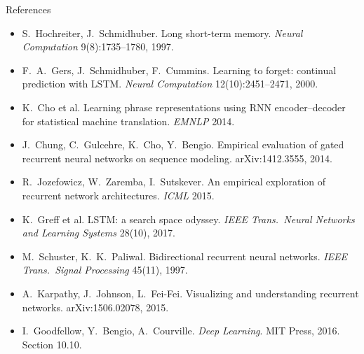 \documentclass[aspectratio=169,10pt]{beamer}
\begin{document}
\begin{frame}[plain]
\begin{columns}[T]
  \end{columns}
\end{frame}

\begin{frame}{References}
  \footnotesize
  \begin{itemize}[<1->]
    \item S.\ Hochreiter, J.\ Schmidhuber. Long short-term memory. \emph{Neural Computation} 9(8):1735--1780, 1997.
    \item F.\ A.\ Gers, J.\ Schmidhuber, F.\ Cummins. Learning to forget: continual prediction with LSTM. \emph{Neural Computation} 12(10):2451--2471, 2000.
    \item K.\ Cho et al. Learning phrase representations using RNN encoder--decoder for statistical machine translation. \emph{EMNLP} 2014.
    \item J.\ Chung, C.\ Gulcehre, K.\ Cho, Y.\ Bengio. Empirical evaluation of gated recurrent neural networks on sequence modeling. arXiv:1412.3555, 2014.
    \item R.\ Jozefowicz, W.\ Zaremba, I.\ Sutskever. An empirical exploration of recurrent network architectures. \emph{ICML} 2015.
    \item K.\ Greff et al. LSTM: a search space odyssey. \emph{IEEE Trans.\ Neural Networks and Learning Systems} 28(10), 2017.
    \item M.\ Schuster, K.\ K.\ Paliwal. Bidirectional recurrent neural networks. \emph{IEEE Trans.\ Signal Processing} 45(11), 1997.
    \item A.\ Karpathy, J.\ Johnson, L.\ Fei-Fei. Visualizing and understanding recurrent networks. arXiv:1506.02078, 2015.
    \item I.\ Goodfellow, Y.\ Bengio, A.\ Courville. \emph{Deep Learning}. MIT Press, 2016. Section 10.10.
  \end{itemize}
\end{frame}
\end{document}
